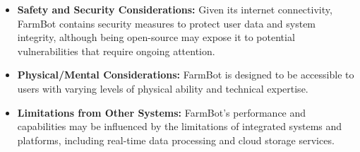 \begin{itemize}
    \item \textbf{Safety and Security Considerations:} Given its internet connectivity, FarmBot contains security measures to protect user data and system integrity, although being open-source may expose it to potential vulnerabilities that require ongoing attention.
    \item \textbf{Physical/Mental Considerations:} FarmBot is designed to be accessible to users with varying levels of physical ability and technical expertise.
    \item \textbf{Limitations from Other Systems:} FarmBot's performance and capabilities may be influenced by the limitations of integrated systems and platforms, including real-time data processing and cloud storage services.
\end{itemize}

\newpage

